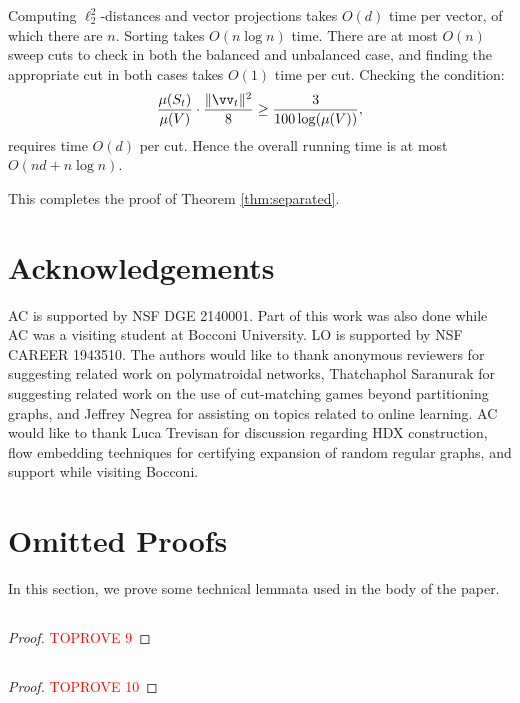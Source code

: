 \documentclass[letterpaper]{article}
\begin{document}
Computing $\ell_2^2$-distances and vector projections takes $O(d)$ time per vector, of which there are $n$. Sorting takes $O(n\log n)$ time. There are at most $O(n)$ sweep cuts to check in both the balanced and unbalanced case, and finding the appropriate cut in both cases takes $O(1)$ time per cut. Checking the condition:
\[
    \frac{\mu(S_t)}{\mu(V)} \cdot \frac{\|\vv_t\|^2}{8} \geq \frac{3}{100 \log(\mu(V))},
\]
requires time $O(d)$ per cut. Hence the overall running time is at most $O(nd + n \log n)$.

This completes the proof of Theorem \ref{thm:separated}.
 

\section{Acknowledgements}

AC is supported by NSF DGE 2140001. Part of this work was also done while AC was a visiting student at Bocconi University. LO is supported by NSF CAREER 1943510. The authors would like to thank anonymous reviewers for suggesting related work on polymatroidal networks, Thatchaphol Saranurak for suggesting related work on the use of cut-matching games beyond partitioning graphs, and Jeffrey Negrea for assisting on topics related to online learning. AC would like to thank Luca Trevisan for discussion regarding HDX construction, flow embedding techniques for certifying expansion of random regular graphs, and support while visiting Bocconi.

\newpage






\newpage
\appendix
\section{Omitted Proofs}
\label{sec.appendix.omitted}

In this section, we prove some technical lemmata used in the body of the paper.

\subsection{}
\label{sec.appendix.omitted.results}
\lemcontinuous*
\begin{proof}\textcolor{red}{TOPROVE 9}\end{proof}
 
\subsection{}
\label{sec.appendix.omitted.polymatroidal}
\submodularsymmetrization*
\begin{proof}\textcolor{red}{TOPROVE 10}\end{proof}
\end{document}

